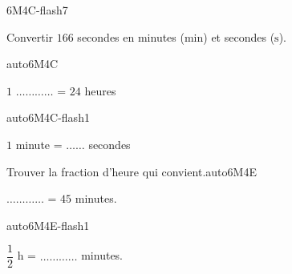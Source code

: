 \documentclass[a4paper,11pt,fleqn]{article}
\begin{document}
\begin{EXO}{}{6M4C-flash7}

 Convertir $166$ secondes en minutes ($\text{min}$) et secondes ($\text{s}$).
\end{EXO}

\begin{EXO}{}{auto6M4C}

 $1$ $\ldots\ldots\ldots\ldots$ = $24$ heures
\end{EXO}

\begin{EXO}{}{auto6M4C-flash1}

 $1$ minute = $\ldots\ldots$ secondes
\end{EXO}

\begin{EXO}{Trouver la fraction d'heure qui convient.}{auto6M4E}

 $\ldots\ldots\ldots\ldots$ = $45$ minutes.
\end{EXO}

\begin{EXO}{}{auto6M4E-flash1}

 $\dfrac12$ h = $\ldots\ldots\ldots\ldots$ minutes.
\end{EXO}


\clearpage
\end{document}
